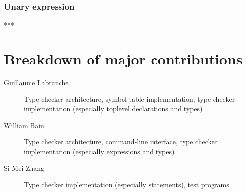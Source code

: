 \documentclass[oneside]{article}
\begin{document}
\subsubsection{Unary expression}
***

\section{Breakdown of major contributions}

\begin{description}
    \item[Guillaume Labranche] Type checker architecture, symbol table implementation, type checker implementation (especially toplevel declarations and types)
    \item[William Bain] Type checker architecture, command-line interface, type checker implementation (especially expressions and types)
    \item[Si Mei Zhang] Type checker implementation (especially statements), test programs
\end{description}
\end{document}
